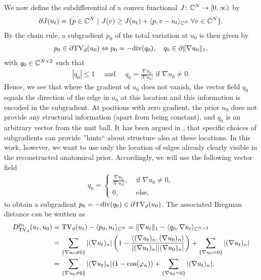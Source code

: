 We now define the subdifferential of a convex functional $J \colon \mathbb{C}^N \to [0,\infty)$ by 
\begin{align*}
      \partial J(u_t) = \{ p \in \mathbb{C}^N ~|~  J(v) \geq J(u_t) + \langle p, v - u_t \rangle_{\mathbb{C}^N} \; \forall v \in \mathbb{C}^N \}. 
\end{align*}
By the chain rule, a subgradient $p_0$ of the total variation at $u_0$ is then given by 
\begin{align*}
	p_0 \in \partial \mathrm{TV}_d (u_0) \Leftrightarrow p_0 = - \mathrm{div} (q_0), \quad q_0 \in \partial \|\nabla u_0 \|_1,
\end{align*}
with $q_0 \in \mathbb{C}^{N \times 2}$ such that 
\begin{align*}
	|q_0| \leq 1 \quad \text{ and } \quad q_0 = \frac{\nabla u_0}{|\nabla u_0|} \text{ if } \nabla u_0 \neq 0.
\end{align*}
Hence, we see that where the gradient of $u_0$ does not vanish, the vector field $q_0$ equals the direction of the edge in $u_0$ at this location and this information is encoded in the subgradient. 
At positions with zero gradient, the prior $u_0$ does not provide any structural information (apart from being constant), and $q_0$ is an arbitrary vector from the unit ball. 
It has been argued in \cite{Osher:AnIterativeRegularizationMethod,Moeller:ColorBregmanTV,Rasch2017}, that specific choices of subgradients can provide ''hints`` about structure also at these locations. 
In this work, however, we want to use only the location of edges already clearly visible in the reconstructed anatomical prior.  
Accordingly, we will use the following vector field 
\begin{align*}
	q_0 = \begin{cases}
			\frac{\nabla u_0}{|\nabla u_0|}, &\text{ if } \nabla u_0 \neq 0, \\
            0, &\text{ else,}
		\end{cases}
\end{align*}
to obtain a subgradient $p_0 = -\mathrm{div} (q_0) \in \partial \mathrm{TV}_d (u_0)$.
The associated Bregman distance can be written as 
\begin{align*}
	D_{\mathrm{TV}_d}^{p_0}(u_t,u_0) 
    &= \mathrm{TV}_d (u_t) - \langle p_0,u_t \rangle_{\mathbb{C}^N}
    = \| \nabla u_t \|_1 - \langle q_0, \nabla u_t \rangle_{\mathbb{C}^{N \times 2}} \\ 
    &= \sum_{ \{\nabla u_0 \neq 0\} } |(\nabla u_t)_n | \left( 1 - \frac{\langle (\nabla u_t)_n, (\nabla u_0)_n \rangle}{|(\nabla u_t)_n||(\nabla u_0)_n|} \right) + \sum_{\{\nabla u_0 = 0\}} |(\nabla u_t)_n| \\
    &= \sum_{\{\nabla u_0 \neq 0 \} } |(\nabla u_t)_n| (1 - \cos (\varphi_n)  ) + \sum_{\{\nabla u_0 = 0 \} } |(\nabla u_t)_n|,
\end{align*}
